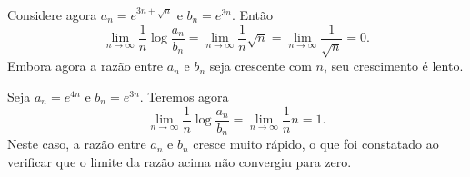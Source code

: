 \begin{frame}[allowframebreaks]
  \framebreak

  \begin{example}
  Considere agora $a_n = e^{3n + \sqrt{n}}$ e $b_n = e^{3n}$. Então 
  \begin{equation}
   \lim_{n \rightarrow \infty} \frac{1}{n} \log \frac{a_n}{b_n} = \lim_{n \rightarrow \infty} \frac{1}{n} \sqrt{n} = \lim_{n \rightarrow \infty} \frac{1}{\sqrt{n}} = 0 .
  \end{equation}
  Embora agora a razão entre $a_n$ e $b_n$ seja crescente com $n$, seu crescimento é lento.
  \end{example} 

  \framebreak

  \begin{example}
  Seja $a_n = e^{4n}$ e $b_n = e^{3n}$. Teremos agora
  \begin{equation}
   \lim_{n \rightarrow \infty} \frac{1}{n} \log \frac{a_n}{b_n} = \lim_{n \rightarrow \infty} \frac{1}{n} n = 1 .
  \end{equation}  
  Neste caso, a razão entre $a_n$ e $b_n$ cresce muito rápido, o que foi constatado ao verificar que o limite 
  da razão acima não convergiu para zero.  
  \end{example}

\end{frame}



